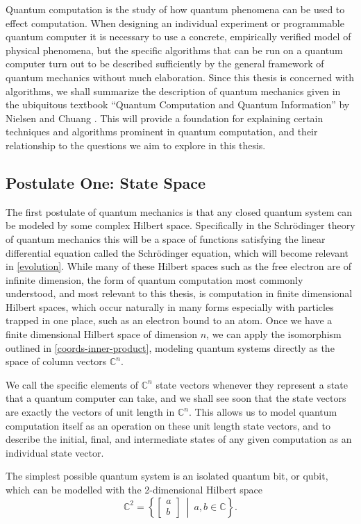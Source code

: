 Quantum computation is the study of how quantum phenomena can be used to effect computation. When designing an individual experiment or programmable quantum computer it is necessary to use a concrete, empirically verified model of physical phenomena, but the specific algorithms that can be run on a quantum computer turn out to be described sufficiently by the general framework of quantum mechanics without much elaboration. Since this thesis is concerned with algorithms, we shall summarize the description of quantum mechanics given in the ubiquitous textbook ``Quantum Computation and Quantum Information'' by Nielsen and Chuang \cite{textbook}. This will provide a foundation for explaining certain techniques and algorithms prominent in quantum computation, and their relationship to the questions we aim to explore in this thesis.
\subsection{Postulate One: State Space}
The first postulate of quantum mechanics is that any closed quantum system can be modeled by some complex Hilbert space. Specifically in the Schrödinger theory of quantum mechanics this will be a space of functions satisfying the linear differential equation called the Schrödinger equation, which will become relevant in \autoref{evolution}. While many of these Hilbert spaces such as the free electron are of infinite dimension, the form of quantum computation most commonly understood, and most relevant to this thesis, is computation in finite dimensional Hilbert spaces, which occur naturally in many forms especially with particles trapped in one place, such as an electron bound to an atom. Once we have a finite dimensional Hilbert space of dimension $n$, we can apply the isomorphism outlined in \autoref{coords-inner-product}, modeling quantum systems directly as the space of column vectors $\mathbb{C}^n$.

We call the specific elements of $\mathbb{C}^n$ state vectors whenever they represent a state that a quantum computer can take, and we shall see soon that the state vectors are exactly the vectors of unit length in $\mathbb{C}^n$. This allows us to model quantum computation itself as an operation on these unit length state vectors, and to describe the initial, final, and intermediate states of any given computation as an individual state vector.

The simplest possible quantum system is an isolated quantum bit, or qubit, which can be modelled with the 2-dimensional Hilbert space
\[
\mathbb{C}^2 = \left\{\left[\begin{matrix}
a\\
b
\end{matrix}\right]\ \middle|\ a, b \in \mathbb{C}\right\}.
\]

